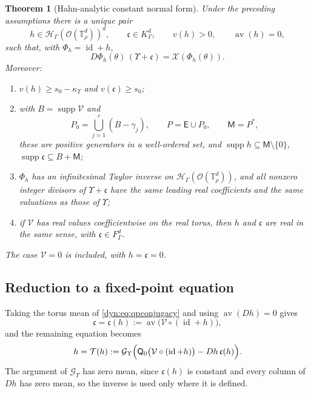 \documentclass[11pt,letterpaper]{article}
\newtheorem{theorem}{Theorem}[section]
\theoremstyle{definition}
\theoremstyle{remark}
\newcommand{\HH}{\mathscr H}
\newcommand{\OO}{\mathcal O}
\newcommand{\id}{\operatorname{id}}
\newcommand{\supp}{\operatorname{supp}}
\newcommand{\TT}{\mathbb T}
\newcommand{\strip}{\OO(\TT^{d}_{\rho})}
\newcommand{\Gups}{\mathcal G_{\Upsilon}}
\newcommand{\kups}{\kappa_{\Upsilon}}
\newcommand{\av}{\operatorname{av}}
\newcommand{\Qz}{\mathsf Q_{0}}
\numberwithin{equation}{section}
\begin{document}
\begin{theorem}[Hahn-analytic constant normal form]
\label{dyn:thm:qpnormalform}
Under the preceding assumptions there is a \emph{unique} pair
\[
 h\in\HH_\Gamma(\strip)^{d},\qquad \mathfrak c\in K_\Gamma^{d},
 \qquad v(h)>0,\qquad \av(h)=0,
\]
such that, with $\Phi_h=\id+h$,
\begin{equation}\label{dyn:eq:qpconjugacy}
 D\Phi_h(\theta)\,(\Upsilon+\mathfrak c)=\mathcal X(\Phi_h(\theta)).
\end{equation}
Moreover:
\begin{enumerate}[label=(\roman*),leftmargin=*]
\item $v(h)\ge s_0-\kups$ and $v(\mathfrak c)\ge s_0$;
\item with $B=\supp\mathcal V$ and
\begin{equation}\label{dyn:eq:qpmonoid}
 P_0=\bigcup_{j=1}^{r}(B-\gamma_j),\qquad
 P=\mathsf E\cup P_0,\qquad \mathsf M=P^{*},
\end{equation}
these are positive generators in a well-ordered set, and
$\supp h\subseteq\mathsf M\setminus\{0\}$,
$\supp\mathfrak c\subseteq B+\mathsf M$;
\item $\Phi_h$ has an infinitesimal Taylor inverse on
$\HH_\Gamma(\strip)$, and all nonzero integer divisors of
$\Upsilon+\mathfrak c$ have the same leading real coefficients and the same
valuations as those of $\Upsilon$;
\item if $\mathcal V$ has real values coefficientwise on the real torus,
then $h$ and $\mathfrak c$ are real in the same sense, with
$\mathfrak c\in F_\Gamma^{d}$.
\end{enumerate}
The case $\mathcal V=0$ is included, with $h=\mathfrak c=0$.
\end{theorem}

\subsection{Reduction to a fixed-point equation}

Taking the torus mean of \eqref{dyn:eq:qpconjugacy} and using
$\av(Dh)=0$ gives
\begin{equation}\label{dyn:eq:qpdrift}
 \mathfrak c=\mathfrak c(h):=\av\bigl(\mathcal V\circ(\id+h)\bigr),
\end{equation}
and the remaining equation becomes
\begin{equation}\label{dyn:eq:qpfixedpoint}
 h=\mathcal T(h):=
 \Gups\Bigl(\Qz\bigl(\mathcal V\circ(\id+h)\bigr)
 -Dh\,\mathfrak c(h)\Bigr).
\end{equation}
The argument of $\Gups$ has zero mean, since $\mathfrak c(h)$ is constant
and every column of $Dh$ has zero mean, so the inverse is used only where
it is defined.
\end{document}
